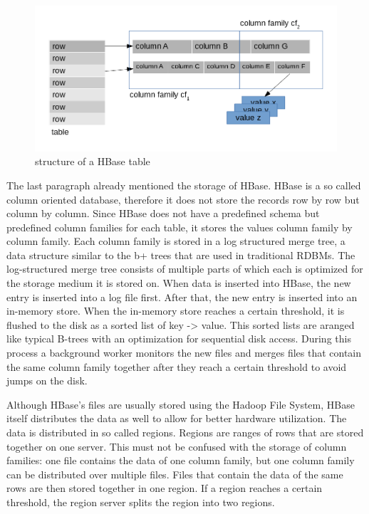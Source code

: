 \begin{figure}[ht]
	\centering
	\includegraphics[width=1\textwidth]{images/hbaseTableStructure}
	\caption{structure of a HBase table}
	\label{hbase.fig1}
\end{figure}

The last paragraph already mentioned the storage of HBase. HBase is a so called column oriented database, therefore it does not store the records row by row but
column by column. Since HBase does not have a predefined schema but predefined column families for each table, it stores the values column family by column family.
Each column family is stored in a log structured merge tree, a data structure similar to the b+ trees that are used in traditional RDBMs. The log-structured merge tree
consists of multiple parts of which each is optimized for the storage medium it is stored on. When data is inserted into HBase, the new entry is inserted into a log file first.
After that, the new entry is inserted into an in-memory store. When the in-memory store reaches a certain threshold, it is flushed to the disk as a sorted list of key -> value.
This sorted lists are aranged like typical B-trees with an optimization for sequential disk access. During this process a background worker monitors the new files and merges files
that contain the same column family together after they reach a certain threshold to avoid jumps on the disk. \cite{hbase.george.2011} \cite{hbase.bertozzi.2012}

Although HBase's files are usually stored using the Hadoop File System, HBase itself distributes the data as well to allow for better hardware utilization. The data is distributed
in so called regions. Regions are ranges of rows that are stored together on one server. This must not be confused with the storage of column families: one file contains the data of one
column family, but one column family can be distributed over multiple files. Files that contain the data of the same rows are then stored together in one region. If a region reaches
a certain threshold, the region server splits the region into two regions. \cite{hbase.george.2011}
